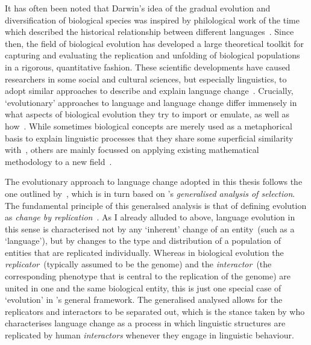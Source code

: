 It has often been noted that Darwin's idea of the gradual evolution and diversification of biological species was inspired by philological work of the time which described the historical relationship between different languages~\citep{Darwin1871}. Since then, the field of biological evolution has developed a large theoretical toolkit for capturing and evaluating the replication and unfolding of biological populations in a rigorous, quantitative fashion. These scientific developments %
have caused researchers in some social and cultural sciences, but especially linguistics, to adopt similar approaches to describe and explain language change~\citep[to list just a few monographs]{Croft2000,Blevins2004,McMahon2005,Ritt2009}.
Crucially, `evolutionary' approaches to language and language change differ immensely in what aspects of biological evolution they try to import or emulate, as well as how~\citep{Croft2000}. While sometimes biological concepts are merely used as a metaphorical basis to explain linguistic processes that they share some superficial similarity with~\citep[e.g.][]{Lass1990}, others are mainly focussed on applying existing mathematical methodology to a new field~\citep{BorgerhoffMulder2001,Atkinson2005a,Jager2008,Castellano2009}.

The evolutionary approach to language change adopted in this thesis follows the one outlined by~\citet{Croft2000}, which is in turn based on \citeauthor{Hull1988}'s \emph{generalised analysis of selection}. The fundamental principle of this generalsed analysis is that of defining evolution as \emph{change by replication}~\citep[p.410]{Hull1988}. As I already alluded to above, language evolution in this sense is characterised not by any `inherent' change of an entity~(such as a `language'), but by changes to the type and distribution of a population of entities that are replicated individually. %
Whereas in biological evolution the \emph{replicator}~(typically assumed to be the genome) and the \emph{interactor}~(the corresponding phenotype that is central to the replication of the genome) are united in one and the same biological entity, this is just one special case of `evolution' in \citeauthor{Hull1988}'s general framework. The generalised analysed allows for the replicators and interactors to be separated out, which is the stance taken by \citet{Croft2000} who characterises language change as a process in which linguistic structures are replicated by human \emph{interactors} whenever they engage in linguistic behaviour.

